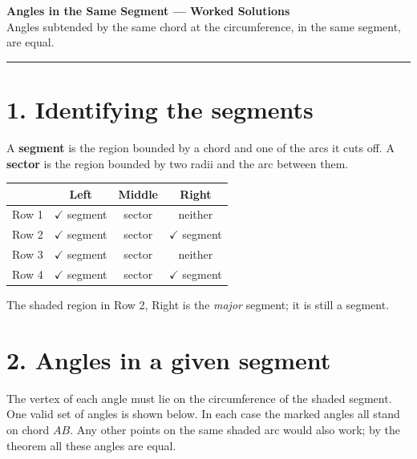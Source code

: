 \documentclass[11pt,a4paper]{article}
\begin{document}
\begin{center}
  {\LARGE \bfseries Angles in the Same Segment --- Worked Solutions}\\[0.25em]
  \small Angles subtended by the same chord at the circumference, in the same segment, are equal.
\end{center}

\hrule
\vspace{1.5em}

\section*{1. Identifying the segments}

A \textbf{segment} is the region bounded by a chord and one of the arcs it cuts off.  
A \textbf{sector} is the region bounded by two radii and the arc between them.

\begin{center}
\begin{tabular}{c|c|c|c}
 & Left & Middle & Right \\ \hline
Row 1 & \(\checkmark\) segment & sector & neither \\
Row 2 & \(\checkmark\) segment & sector & \(\checkmark\) segment \\
Row 3 & \(\checkmark\) segment & sector & neither \\
Row 4 & \(\checkmark\) segment & sector & \(\checkmark\) segment
\end{tabular}
\end{center}

The shaded region in Row 2, Right is the \emph{major} segment; it is still a segment.

\section*{2. Angles in a given segment}

The vertex of each angle must lie on the circumference of the shaded segment.  
One valid set of angles is shown below. In each case the marked angles all stand on chord \(AB\).  
Any other points on the same shaded arc would also work; by the theorem all these angles are equal.
\end{document}
